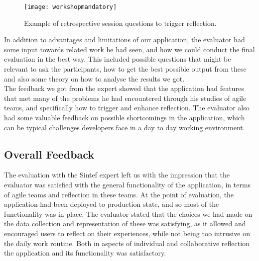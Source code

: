 \begin{figure}[H]
    \centering
        \texttt{[image: workshopmandatory]}
    \caption{Example of retrospective session questions to trigger reflection.}
    \label{workshopmandatoryexpertreview}
\end{figure}

In addition to advantages and limitations of our application, the evaluator had some input towards related work he had seen, and how we could conduct the final evaluation in the best way. This included possible questions that might be relevant to ask the participants, how to get the best possible output from these and also some theory on how to analyse the results we got. \\
The feedback we got from the expert showed that the application had features that met many of the problems he had encountered through his studies of agile teams, and specifically how to trigger and enhance reflection. The evaluator also had some valuable feedback on possible shortcomings in the application, which can be typical challenges developers face in a day to day working environment. 

\subsection{Overall Feedback}
The evaluation with the Sintef expert left us with the impression that the evaluator was satisfied with the general functionality of the application, in terms of agile teams and reflection in these teams. 
At the point of evaluation, the application had been deployed to production state, and so most of the functionality was in place. The evaluator stated that the choices we had made on the data collection and representation of these was satisfying, as it allowed and encouraged users to reflect on their experiences, while not being too intrusive on the daily work routine. Both in aspects of individual and collaborative reflection the application and its functionality was satisfactory. \\

